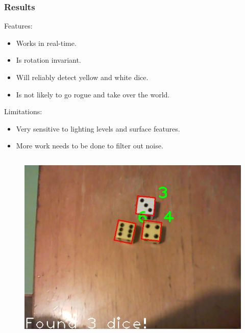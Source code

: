 \documentclass{beamer}
\begin{document}
\begin{frame}
\frametitle{Results}

Features:
\begin{itemize}
	\item Works in real-time.
	\item Is rotation invariant.
	\item Will reliably detect yellow and white dice.
	\item Is not likely to go rogue and take over the world.
\end{itemize}

\vspace{\baselineskip}

Limitations:
\begin{itemize}
	\item Very sensitive to lighting levels and surface features.
	\item More work needs to be done to filter out noise.
\end{itemize}

\begin{columns}


\begin{figure}
	\centering
	\includegraphics[width=\textwidth]{dice_1}
\end{figure}



\end{columns}
\end{frame}
\end{document}
